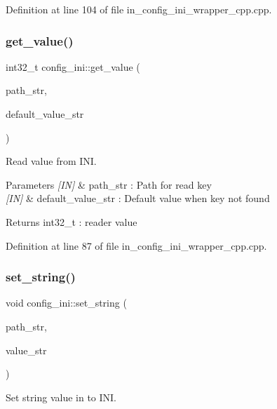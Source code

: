 Definition at line 104 of file in\+\_\+config\+\_\+ini\+\_\+wrapper\+\_\+cpp.\+cpp.

\mbox{\label{group__configuration_ga236e0b85962885eba22c0cf2b5c04fa7}} 
\subsubsection{get\_value()}
{\footnotesize\ttfamily int32\+\_\+t config\+\_\+ini\+::get\+\_\+value (\begin{DoxyParamCaption}\item[{wx\+String}]{path\+\_\+str,  }\item[{wx\+String}]{default\+\_\+value\+\_\+str }\end{DoxyParamCaption})}



Read value from I\+NI. 


\begin{DoxyParams}{Parameters}
{\em \mbox{[}\+I\+N\mbox{]}} & path\+\_\+str \+: Path for read key \\
\hline
{\em \mbox{[}\+I\+N\mbox{]}} & default\+\_\+value\+\_\+str \+: Default value when key not found \\
\hline
\end{DoxyParams}
\begin{DoxyReturn}{Returns}
int32\+\_\+t \+: reader value 
\end{DoxyReturn}


Definition at line 87 of file in\+\_\+config\+\_\+ini\+\_\+wrapper\+\_\+cpp.\+cpp.

\mbox{\label{group__configuration_gace7d2bc7d7b734f6b9ff65646b6489f2}} 
\subsubsection{set\_string()}
{\footnotesize\ttfamily void config\+\_\+ini\+::set\+\_\+string (\begin{DoxyParamCaption}\item[{wx\+String}]{path\+\_\+str,  }\item[{wx\+String}]{value\+\_\+str }\end{DoxyParamCaption})}



Set string value in to I\+NI. 


